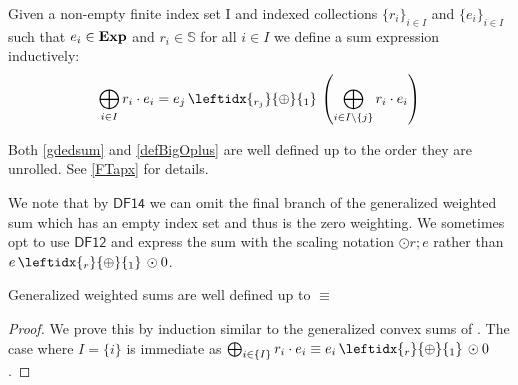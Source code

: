\documentclass[a4paper,UKenglish,cleveref, autoref, thm-restate]{lipics-v2021}
\newcommand{\Exp}{\textbf{\upshape{Exp}}}
\newcommand{\WC}[2]{\,\leftidx{_{#1}}{{\oplus}}{_{#2}}\,}
\newcommand{\Ax}[1]{\ensuremath{\mathsf{#1}}}
\newcommand{\probgkat}{\textsf{\upshape{ProbGKAT}}\xspace}
\theoremstyle{plain}\newtheoremrep{thm}{Theorem}[section]
\begin{document}
		\begin{defn} 
			\label{defBigOplus}
			Given a non-empty finite index set I and indexed collections $\{r_i\}_{i\in I}$ and $\{e_i\}_{i\in I}$ such that $e_i \in \Exp$ and $r_i \in \mathbb S$ for all $i\in I$ we define a sum  expression inductively:
			$$\bigoplus_{i\in I}r_i \cdot e_i = e_j \WC{r_j}{1} \left( \bigoplus_{i\in I\setminus\{j\}}r_i\cdot e_i \right)$$
		\end{defn}
		Both \cref{gdedsum} and \cref{defBigOplus} are well defined up to the order they are unrolled. See \cref{FTapx} for details.
	\begin{toappendix}
		
		We note that by \Ax{DF14} we can omit the final branch of the generalized weighted sum which has an empty index set and thus is the zero weighting. We sometimes opt to use \Ax{DF12} and express the sum with the scaling notation $\odot r;e$ rather than $e \WC{r}{1} \odot 0$.
		
		\begin{lem}
			Generalized weighted sums are well defined up to $\equiv$ \label{lem59} 
		\end{lem}
		\begin{proof}
			We prove this by induction similar to the generalized convex sums of \probgkat \cite{rozowski2023probabilistic}. The case where $I=\{i\}$ is immediate as $\bigoplus_{i\in \{I\}} r_i\cdot e_i \equiv e_i \WC{r}{1} \odot 0$.
			 

\end{proof}
\end{toappendix}
\end{document}
